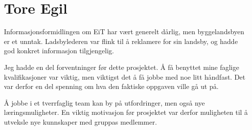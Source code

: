\section{Tore Egil}
Informasjonsformidlingen om EiT har vært generelt dårlig, men byggelandsbyen
er et unntak. Ladsbylederen var flink til å reklamere for sin landsby, og hadde
god konkret informasjon tilgjengelig. 

Jeg hadde en del forventninger før dette prosjektet. Å få benyttet mine faglige
kvalifikasjoner var viktig, men viktigst det å få jobbe med noe litt håndfast.
Det var derfor en del spenning om hva den faktiske oppgaven ville gå ut på.

Å jobbe i et tverrfaglig team kan by på utfordringer, men også nye
læringsmuligheter. En viktig motivasjon før prosjektet var derfor muligheten til
å utveksle nye kunnskaper med gruppas medlemmer.


